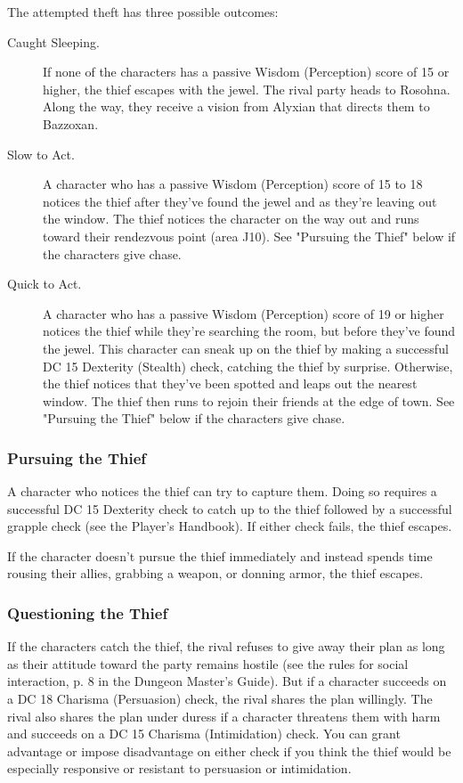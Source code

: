 \documentclass[letterpaper, 11pt, bg=full, twocolumn]{dndbook}
\begin{document}
The attempted theft has three possible outcomes:

\begin{description}
\item[Caught Sleeping.] If none of the characters has a passive Wisdom (Perception) score of 15 or higher, the thief escapes with the jewel. The rival party heads to Rosohna. Along the way, they receive a vision from Alyxian that directs them to Bazzoxan.
\item[Slow to Act.] A character who has a passive Wisdom (Perception) score of 15 to 18 notices the thief after they've found the jewel and as they're leaving out the window. The thief notices the character on the way out and runs toward their rendezvous point (area J10). See "Pursuing the Thief" below if the characters give chase.
\item[Quick to Act.] A character who has a passive Wisdom (Perception) score of 19 or higher notices the thief while they're searching the room, but before they've found the jewel. This character can sneak up on the thief by making a successful DC 15 Dexterity (Stealth) check, catching the thief by surprise. Otherwise, the thief notices that they've been spotted and leaps out the nearest window. The thief then runs to rejoin their friends at the edge of town. See "Pursuing the Thief" below if the characters give chase.
\end{description}

\subsubsection{Pursuing the Thief}

A character who notices the thief can try to capture them. Doing so requires a successful DC 15 Dexterity check to catch up to the thief followed by a successful grapple check (see the Player's Handbook). If either check fails, the thief escapes.

If the character doesn't pursue the thief immediately and instead spends time rousing their allies, grabbing a weapon, or donning armor, the thief escapes.

\subsubsection{Questioning the Thief}

If the characters catch the thief, the rival refuses to give away their plan as long as their attitude toward the party remains hostile (see the rules for social interaction, p. 8 in the Dungeon Master's Guide). But if a character succeeds on a DC 18 Charisma (Persuasion) check, the rival shares the plan willingly. The rival also shares the plan under duress if a character threatens them with harm and succeeds on a DC 15 Charisma (Intimidation) check. You can grant advantage or impose disadvantage on either check if you think the thief would be especially responsive or resistant to persuasion or intimidation.
\end{document}
